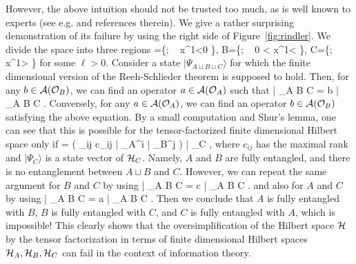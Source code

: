 \documentclass[a4paper,11pt]{article}
\theoremstyle{plain}
\theoremstyle{definition}
\numberwithin{thm}{section}
\newcommand{\ket}[1]{ | {#1} \rangle }
\def\CA{{\cal A}}
\def\CH{{\cal H}}
\def\CO{{\cal O}}
\def\beq#1\eeq{\begin{align}#1\end{align}}
\begin{document}
However, the above intuition should not be trusted too much, as is well known to experts (see e.g. \cite{Witten:2018zxz} and references therein).
We give a rather surprising demonstration of its failure by using the right side of Figure~\ref{fig:rindler}. 
We divide the space into three regions
\beq
A=\{; ~ x^1<0 \}, \qquad B=\{; ~ 0 < x^1< \ell\}, \qquad C=\{; ~ x^1> \ell \}
\eeq
for some $\ell>0$. Consider a state $\ket{\Psi_{A \sqcup B \sqcup C}}$ for which the finite dimensional version of the Reeh-Schlieder theorem is supposed to hold.
Then, for any $b \in \CA(\CO_B)$, we can find an operator $a \in \CA(\CO_A)$ such that
\beq
a\ket{\Psi_{A \sqcup B \sqcup C}} = b \ket{\Psi_{A \sqcup B \sqcup C}}.
\eeq
Conversely, for any $a \in \CA(\CO_A)$, we can find an operator $b \in \CA(\CO_B)$ satisfying the above equation.
By a small computation and Shur's lemma, one can see that this is possible for the tensor-factorized finite dimensional Hilbert space only if
\beq
\ket{\Psi_{A \sqcup B \sqcup C}} = \left( \sum_{ij} c_{ij}\ket{\psi_A^i} \otimes \ket{\psi_B^j} \right) \otimes \ket{\Psi_C},
\eeq
where $c_{ij}$ has the maximal rank and $\ket{\Psi_C}$ is a state vector of $\CH_C$. 
Namely, $A$ and $B$ are fully entangled, and there is no entanglement between $A \sqcup B$ and $C$.
However, we can repeat the same argument for $B$ and $C$ by using 
\beq
b\ket{\Psi_{A \sqcup B \sqcup C}} = c \ket{\Psi_{A \sqcup B \sqcup C}}.
\eeq
and also for $A$ and $C$ by using
\beq
c\ket{\Psi_{A \sqcup B \sqcup C}} = a \ket{\Psi_{A \sqcup B \sqcup C}}.
\eeq
Then we conclude that $A$ is fully entangled with $B$, $B$ is fully entangled with $C$, and $C$ is fully entangled with $A$, which is impossible!
This clearly shows that the oversimplification of the Hilbert space $\CH$ by the tensor factorization in terms of finite dimensional Hilbert spaces $\CH_A,\CH_B, \CH_C$ can fail in the context of
information theory.
\end{document}
